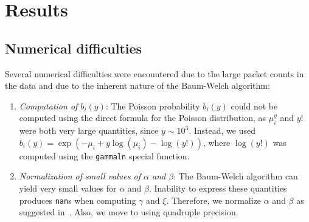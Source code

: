 \documentclass[11pt, twoside]{article}
\begin{document}
\section{Results}

\subsection{Numerical difficulties}

Several numerical difficulties were encountered due to the large packet counts in the data and due to the inherent nature of the Baum-Welch algorithm:
\begin{enumerate}
	\item \emph{Computation of $b_i(y)$}: The Poisson probability $b_i(y)$ could not be computed using the direct formula for the Poisson distribution, as $\mu_i^y$ and $y!$ were both very large quantities, since $y \sim 10^3$. Instead, we used $b_i(y) = \exp( -\mu_i + y \log(\mu_i) - \log(y!) )$, where $\log(y!)$ was computed using the \verb+gammaln+ special function.
	\item \emph{Normalization of small values of $\alpha$ and $\beta$}: The Baum-Welch algorithm can yield very small values for $\alpha$ and $\beta$. Inability to express these quantities produces \verb+nan+s when computing $\gamma$ and $\xi$. Therefore, we normalize $\alpha$ and $\beta$ as suggested in~\cite{textbook}. Also, we move to using quadruple precision.
\end{enumerate}
\end{document}
